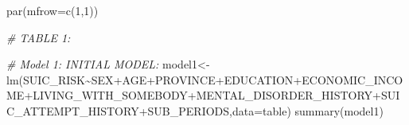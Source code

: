 \documentclass[
]{book}
\newenvironment{Shaded}{\begin{snugshade}}{\end{snugshade}}
\newcommand{\AttributeTok}[1]{\textcolor[rgb]{0.77,0.63,0.00}{#1}}
\newcommand{\CommentTok}[1]{\textcolor[rgb]{0.56,0.35,0.01}{\textit{#1}}}
\newcommand{\DecValTok}[1]{\textcolor[rgb]{0.00,0.00,0.81}{#1}}
\newcommand{\FunctionTok}[1]{\textcolor[rgb]{0.00,0.00,0.00}{#1}}
\newcommand{\NormalTok}[1]{#1}
\newcommand{\OtherTok}[1]{\textcolor[rgb]{0.56,0.35,0.01}{#1}}
\newcommand{\SpecialCharTok}[1]{\textcolor[rgb]{0.00,0.00,0.00}{#1}}
\begin{document}
\begin{Shaded}
\begin{Highlighting}[]
\FunctionTok{par}\NormalTok{(}\AttributeTok{mfrow=}\FunctionTok{c}\NormalTok{(}\DecValTok{1}\NormalTok{,}\DecValTok{1}\NormalTok{))}


\CommentTok{\# TABLE 1:}

\CommentTok{\# Model 1: INITIAL MODEL:}
\NormalTok{model1}\OtherTok{\textless{}{-}}\FunctionTok{lm}\NormalTok{(SUIC\_RISK}\SpecialCharTok{\textasciitilde{}}\NormalTok{SEX}\SpecialCharTok{+}\NormalTok{AGE}\SpecialCharTok{+}\NormalTok{PROVINCE}\SpecialCharTok{+}\NormalTok{EDUCATION}\SpecialCharTok{+}\NormalTok{ECONOMIC\_INCOME}\SpecialCharTok{+}\NormalTok{LIVING\_WITH\_SOMEBODY}\SpecialCharTok{+}\NormalTok{MENTAL\_DISORDER\_HISTORY}\SpecialCharTok{+}\NormalTok{SUIC\_ATTEMPT\_HISTORY}\SpecialCharTok{+}\NormalTok{SUB\_PERIODS,}\AttributeTok{data=}\NormalTok{table)}
\FunctionTok{summary}\NormalTok{(model1)}
\end{Highlighting}
\end{Shaded}
\end{document}
